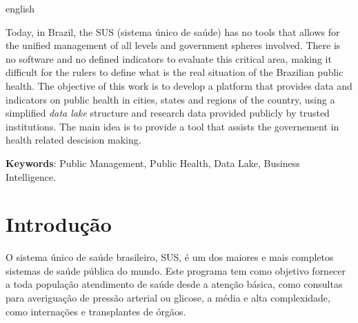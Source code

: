 \documentclass[
	12pt,				%
	openright,			%
	oneside,			%
	a4paper,			%
	chapter=TITLE,		%
	section=TITLE,		%
	subsection=TITLE,	%
	subsubsection=TITLE,%
	english,			%
	brazil				%
	]{abntex2}
\theoremstyle{definition}
\begin{document}
\begin{resumo}[Abstract]
 \begin{otherlanguage*}{english}
 
Today, in Brazil, the SUS (sistema único de saúde) has no tools that allows for the unified management of all levels and government spheres involved. There is no software and no defined indicators to evaluate this critical area, making it difficult for the rulers to define what is the real situation of the Brazilian public health.
The objective of this work is to develop a platform that provides data and indicators on public health in cities, states and regions of the country, using a simplified \textit{data lake} 
structure and research data provided publicly by trusted institutions. The main idea is 
to provide a tool that assists the governement in health related descision making.

   \vspace{\onelineskip}

   \noindent 
   \textbf{Keywords}: Public Management, Public Health, Data Lake, Business Intelligence.
 \end{otherlanguage*}
\end{resumo}

\tableofcontents*
\cleardoublepage



\textual
\pagestyle{simple}

\chapter{Introdução}

    O sistema único de saúde brasileiro, SUS, é um dos maiores e mais completos sistemas de saúde pública do mundo. Este programa tem como objetivo fornecer a toda população atendimento de saúde desde a atenção básica, como consultas para averiguação de pressão arterial ou glicose, a média e alta complexidade, como internações e transplantes de órgãos.
    
\end{document}
